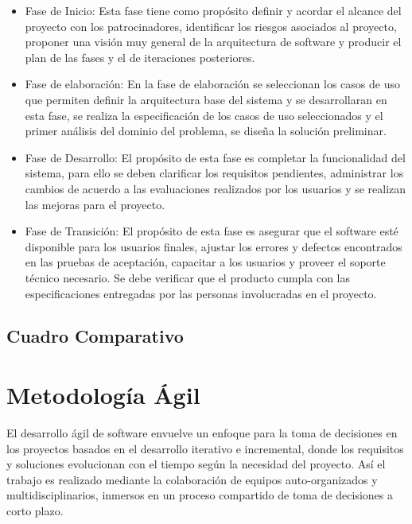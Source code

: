 \begin{itemize}

    \item Fase de Inicio: Esta fase tiene como propósito definir y acordar el alcance del proyecto con los patrocinadores, identificar los riesgos asociados al proyecto, proponer una visión muy general de la arquitectura de software y producir el plan de las fases y el de iteraciones posteriores.

	\item Fase de elaboración: En la fase de elaboración se seleccionan los casos de uso que permiten definir la arquitectura base del sistema y se desarrollaran en esta fase, se realiza la especificación de los casos de uso seleccionados y el primer análisis del dominio del problema, se diseña la solución preliminar.

	\item Fase de Desarrollo: El propósito de esta fase es completar la funcionalidad del sistema, para ello se deben clarificar los requisitos pendientes, administrar los cambios de acuerdo a las evaluaciones realizados por los usuarios y se realizan las mejoras para el proyecto.

	\item Fase de Transición: El propósito de esta fase es asegurar que el software esté disponible para los usuarios finales, ajustar los errores y defectos encontrados en las pruebas de aceptación, capacitar a los usuarios y proveer el soporte técnico necesario. Se debe verificar que el producto cumpla con las especificaciones entregadas por las personas involucradas en el proyecto.	

\end{itemize}
\subsection{Cuadro Comparativo}

\section{Metodología Ágil} 

El desarrollo ágil de software envuelve un enfoque para la toma de decisiones en los proyectos basados en el desarrollo iterativo e incremental, donde los requisitos y soluciones evolucionan con el tiempo según la necesidad del proyecto. Así el trabajo es realizado mediante la colaboración de equipos auto-organizados y multidisciplinarios, inmersos en un proceso compartido de toma de decisiones a corto plazo.

